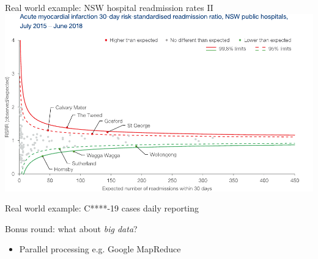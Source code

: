 \documentclass[aspectratio=169,12pt,usepdftitle=false]{beamer} %
\begin{document}
\begin{frame}{Real world example: NSW hospital readmission rates II}
\centering
\includegraphics[height=0.75\textheight]
	{ref/ami-rsrr.pdf}


\end{frame}

\begin{frame}{Real world example: C****-19 cases daily reporting}
\end{frame}

\begin{frame}{Bonus round: what about \emph{big data}?}
    \begin{itemize}
	\item Parallel processing e.g. Google MapReduce
    \end{itemize}
\end{frame}

%
%
%
%
%




\end{document}
